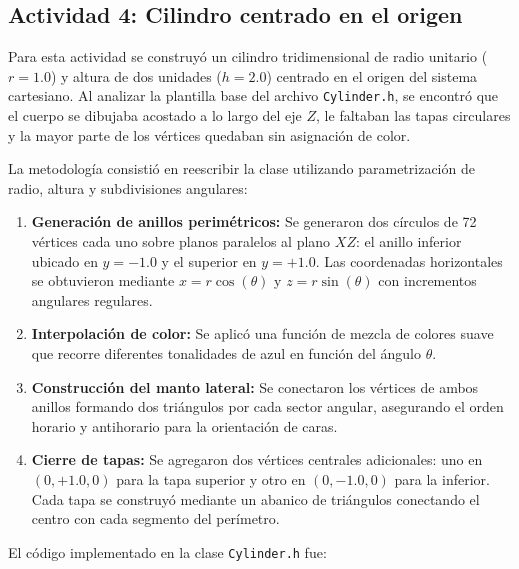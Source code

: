 \subsection{Actividad 4: Cilindro centrado en el origen}

Para esta actividad se construyó un cilindro tridimensional de radio unitario ($r = 1.0$) y altura de dos unidades ($h = 2.0$) centrado en el origen del sistema cartesiano. Al analizar la plantilla base del archivo \texttt{Cylinder.h}, se encontró que el cuerpo se dibujaba acostado a lo largo del eje $Z$, le faltaban las tapas circulares y la mayor parte de los vértices quedaban sin asignación de color.

La metodología consistió en reescribir la clase utilizando parametrización de radio, altura y subdivisiones angulares:
\begin{enumerate}
    \item \textbf{Generación de anillos perimétricos:} Se generaron dos círculos de 72 vértices cada uno sobre planos paralelos al plano $XZ$: el anillo inferior ubicado en $y = -1.0$ y el superior en $y = +1.0$. Las coordenadas horizontales se obtuvieron mediante $x = r \cos(\theta)$ y $z = r \sin(\theta)$ con incrementos angulares regulares.
    \item \textbf{Interpolación de color:} Se aplicó una función de mezcla de colores suave que recorre diferentes tonalidades de azul en función del ángulo $\theta$.
    \item \textbf{Construcción del manto lateral:} Se conectaron los vértices de ambos anillos formando dos triángulos por cada sector angular, asegurando el orden horario y antihorario para la orientación de caras.
    \item \textbf{Cierre de tapas:} Se agregaron dos vértices centrales adicionales: uno en $(0, +1.0, 0)$ para la tapa superior y otro en $(0, -1.0, 0)$ para la inferior. Cada tapa se construyó mediante un abanico de triángulos conectando el centro con cada segmento del perímetro.
\end{enumerate}

El código implementado en la clase \texttt{Cylinder.h} fue:

